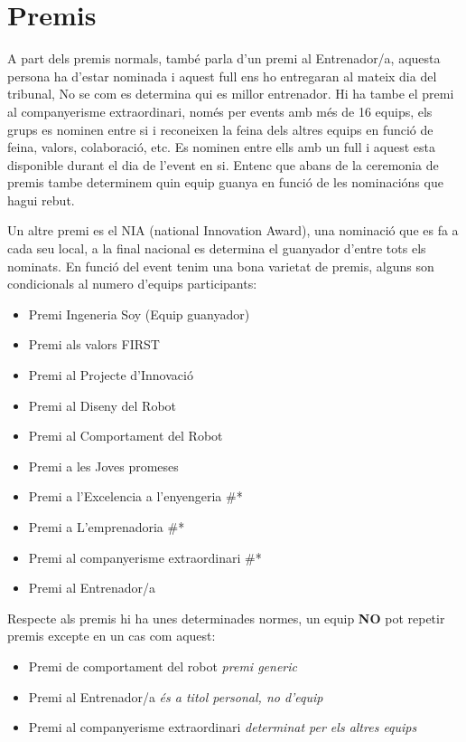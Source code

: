 \documentclass{article}
\begin{document}
\section{Premis}


A part dels premis normals, també parla d’un premi al Entrenador/a, aquesta persona ha d’estar nominada i aquest full ens ho entregaran al mateix dia del tribunal, No se com es determina qui es millor entrenador. 
\hfill \break\hfill \break
Hi ha tambe el premi al companyerisme extraordinari, només per events amb més de 16 equips, els grups es nominen entre si i reconeixen la feina dels altres equips en funció de feina, valors, colaboració, etc. Es nominen entre ells amb un full i aquest esta disponible durant el dia de l’event en si. Entenc que abans de la ceremonia de premis tambe determinem quin equip guanya en funció de les nominacións que hagui rebut. 

Un altre premi es el NIA (national Innovation Award), una nominació que es fa a cada seu local, a la final nacional es determina el guanyador d’entre tots els nominats.
\hfill \break\hfill \break
En funció del event tenim una bona varietat de premis, alguns son condicionals al numero d’equips participants:

\begin{itemize}
    \item Premi Ingeneria Soy (Equip guanyador)
    \item Premi als valors FIRST
    \item Premi al Projecte d’Innovació
    \item Premi al Diseny del Robot
    \item Premi al Comportament del Robot
    \item Premi a les Joves promeses
    \item Premi a l’Excelencia a l’enyengeria \#*
    \item Premi a L’emprenadoria \#*
    \item Premi al companyerisme extraordinari \#*
    \item Premi al Entrenador/a
\end{itemize}

Respecte als premis hi ha unes determinades normes, un equip \textbf{NO} pot repetir premis excepte en un cas com aquest:

\begin{itemize}
    \item Premi de comportament del robot \textit{premi generic}
    \item Premi al Entrenador/a \textit{és a titol personal, no d'equip}
    \item Premi al companyerisme extraordinari \textit{determinat per els altres equips}
\end{itemize}
\end{document}
